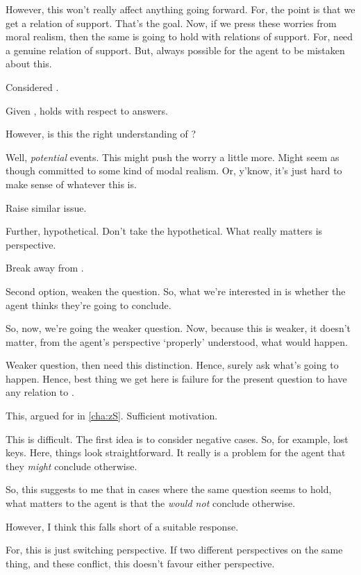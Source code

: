 \begin{note}
  However, this won't really affect anything going forward.
  For, the point is that we get a relation of support.
  That's the goal.
  Now, if we press these worries from moral realism, then the same is going to hold with relations of support.
  For, need a genuine relation of support.
  But, always possible for the agent to be mistaken about this.
\end{note}

\begin{note}
  Considered \ptivity{}.

  Given \qzS{}, \ptivity{} holds with respect to answers.

  However, is this the right understanding of \qzS{}?
\end{note}

\begin{note}
  Well, \emph{potential} events.
  This might push the worry a little more.
  Might seem as though committed to some kind of modal realism.
  Or, y'know, it's just hard to make sense of whatever this is.
\end{note}

\begin{note}
  Raise similar issue.

  Further, hypothetical.
  Don't take the hypothetical.
  What really matters is perspective.
\end{note}

\begin{note}
  Break \qzS{} away from \qWhy{}.
\end{note}

\begin{note}
  Second option, weaken the question.
  So, what we're interested in is whether the agent thinks they're going to conclude.

  So, now, we're going the weaker question.
  Now, because this is weaker, it doesn't matter, from the agent's perspective `properly' understood, what would happen.

  Weaker question, then need this distinction.
  Hence, surely ask what's going to happen.
  Hence, best thing we get here is failure for the present question to have any relation to \qWhy{}.

  This, argued for in \autoref{cha:zS}.
  Sufficient motivation.
\end{note}

\begin{note}
  This is difficult.
  The first idea is to consider negative cases.
  So, for example, lost keys.
  Here, things look straightforward.
  It really is a problem for the agent that they \emph{might} conclude otherwise.

  So, this suggests to me that in cases where the same question seems to hold, what matters to the agent is that the \emph{would not} conclude otherwise.

  However, I think this falls short of a suitable response.

  For, this is just switching perspective.
  If two different perspectives on the same thing, and these conflict, this doesn't favour either perspective.
\end{note}

